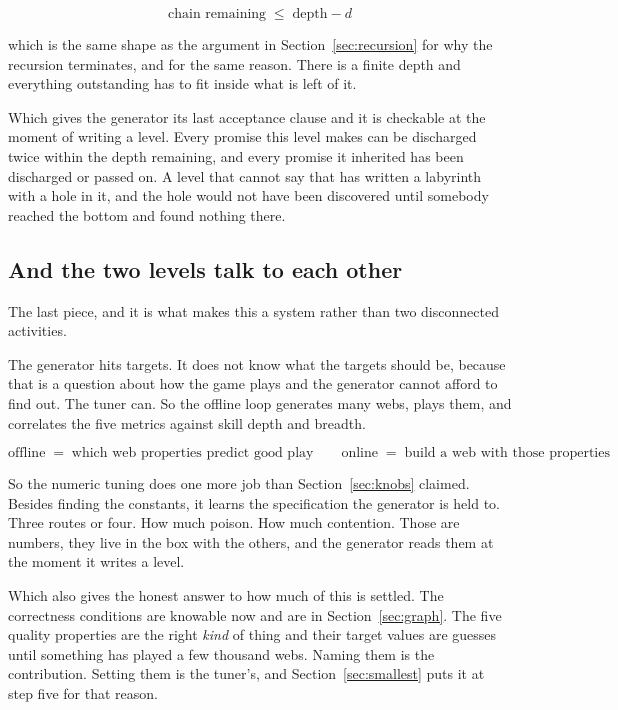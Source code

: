 \documentclass[11pt,a4paper]{article}
\begin{document}
\[ \text{chain remaining} \;\leq\; \text{depth} - d \]

which is the same shape as the argument in Section~\ref{sec:recursion} for why the recursion
terminates, and for the same reason. There is a finite depth and everything outstanding has to fit
inside what is left of it.

\begin{alarmbox}
Which gives the generator its last acceptance clause and it is checkable at the moment of writing a
level. Every promise this level makes can be discharged twice within the depth remaining, and every
promise it inherited has been discharged or passed on. A level that cannot say that has written
a labyrinth with a hole in it, and the hole would not have been discovered until somebody reached
the bottom and found nothing there.
\end{alarmbox}

\subsection{And the two levels talk to each other}

The last piece, and it is what makes this a system rather than two disconnected activities.

The generator hits targets. It does not know what the targets should be, because that is a question
about how the game plays and the generator cannot afford to find out. The tuner can. So the offline
loop generates many webs, plays them, and correlates the five metrics against skill depth and
breadth.

\[ \text{offline} \;=\; \text{which web properties predict good play} \qquad
   \text{online} \;=\; \text{build a web with those properties} \]

\begin{sectionbox}
So the numeric tuning does one more job than Section~\ref{sec:knobs} claimed. Besides finding the
constants, it learns the specification the generator is held to. Three routes or four. How much
poison. How much contention. Those are numbers, they live in the box with the others, and the
generator reads them at the moment it writes a level.
\end{sectionbox}

Which also gives the honest answer to how much of this is settled. The correctness conditions are
knowable now and are in Section~\ref{sec:graph}. The five quality properties are the right
\emph{kind} of thing and their target values are guesses until something has played a few thousand
webs. Naming them is the contribution. Setting them is the tuner's, and Section~\ref{sec:smallest}
puts it at step five for that reason.
\end{document}
